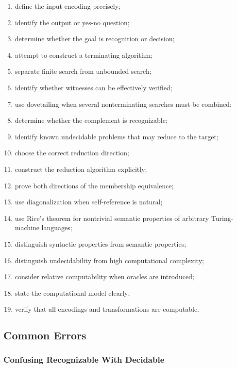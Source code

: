 \begin{enumerate}
    \item define the input encoding precisely;
    \item identify the output or yes-no question;
    \item determine whether the goal is recognition or decision;
    \item attempt to construct a terminating algorithm;
    \item separate finite search from unbounded search;
    \item identify whether witnesses can be effectively verified;
    \item use dovetailing when several nonterminating searches must be
          combined;
    \item determine whether the complement is recognizable;
    \item identify known undecidable problems that may reduce to the target;
    \item choose the correct reduction direction;
    \item construct the reduction algorithm explicitly;
    \item prove both directions of the membership equivalence;
    \item use diagonalization when self-reference is natural;
    \item use Rice's theorem for nontrivial semantic properties of arbitrary
          Turing-machine languages;
    \item distinguish syntactic properties from semantic properties;
    \item distinguish undecidability from high computational complexity;
    \item consider relative computability when oracles are introduced;
    \item state the computational model clearly;
    \item verify that all encodings and transformations are computable.
\end{enumerate}

\subsection{Common Errors}
\label{subsec:computability-common-errors}

\subsubsection{Confusing Recognizable With Decidable}

